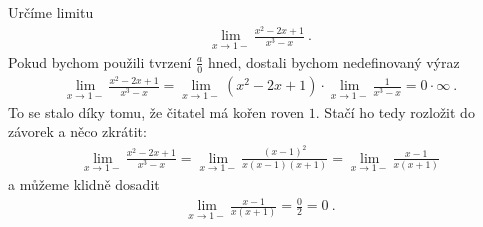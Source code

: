 \begin{example}
    Určíme limitu
    \begin{align}
        \lim_{x \rightarrow 1-} \frac{x^2-2x+1}{x^3-x} \:.
    \end{align}
    Pokud bychom použili tvrzení $\frac{a}{0}$ hned, dostali bychom nedefinovaný výraz
    \begin{align}
        \lim_{x \rightarrow 1-} \frac{x^2-2x+1}{x^3-x} = \lim_{x \rightarrow 1-} (x^2-2x+1) \cdot \lim_{x \rightarrow 1-} \frac{1}{x^3-x} = 0 \cdot \infty \:.
    \end{align}
    To se stalo díky tomu, že čitatel má kořen roven $1$. Stačí ho tedy rozložit do závorek a něco zkrátit:
    \begin{align}
        \lim_{x \rightarrow 1-} \frac{x^2-2x+1}{x^3-x} = \lim_{x \rightarrow 1-} \frac{(x-1)^2}{x(x-1)(x+1)} = \lim_{x \rightarrow 1-} \frac{x-1}{x(x+1)}
    \end{align}
    a můžeme klidně dosadit
    \begin{align}
        \lim_{x \rightarrow 1-} \frac{x-1}{x(x+1)} = \frac{0}{2} = 0 \:.
    \end{align}
\end{example}

